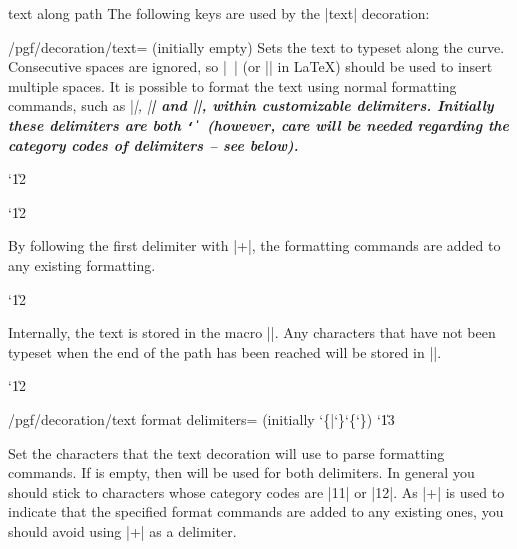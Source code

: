 \begin{decoration}{text along path}
    The following keys are used by the |text| decoration:
    \begin{key}{/pgf/decoration/text= (initially \normalfont empty)}
        Sets the text to typeset along the curve. Consecutive spaces are
        ignored, so |\ | (or |\space| in \LaTeX) should be used to insert
        multiple spaces. It is possible to format the text using normal
        formatting commands, such as |\it|, |\bf| and |\color|, within
        customizable delimiters. Initially these delimiters are both
        {\tt\char`\|} (however, care will be needed regarding the category
        codes of delimiters -- see below).
{\catcode`\|12
\begin{codeexample}[]
\catcode`\|12
\end{codeexample}
}
        By following the first delimiter with |+|, the formatting commands are
        added to any existing formatting.
{\catcode`\|12
\begin{codeexample}[]
\end{codeexample}
}

        Internally, the text is stored in the macro |\pgfdecorationtext|. Any
        characters that have not been typeset when the end of the path has been
        reached will be stored in |\pgfdecorationrestoftext|.
    \end{key}

{\catcode`\|12
    \begin{key}{/pgf/decoration/text format delimiters= (initially \char`\{|\char`\}\char`\{\char`\})}
            \catcode`\|13

        Set the characters that the text decoration will use to parse
        formatting commands. If  is empty, then  will
        be used for both delimiters. In general you should stick to characters
        whose category codes are |11| or |12|. As |+| is used to indicate that
        the specified format commands are added  to any existing ones, you
        should avoid using |+| as a delimiter.
\begin{codeexample}[]
\end{codeexample}
    \end{key}
}


\end{decoration}
